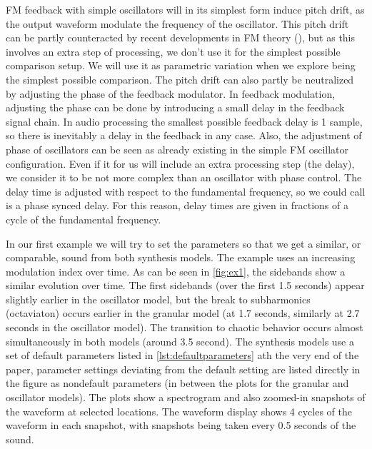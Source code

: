 \documentclass[runningheads,a4paper]{llncs}
\begin{document}
FM feedback with simple oscillators will in its simplest form induce pitch drift, as the output waveform modulate the frequency of the oscillator. This pitch drift can be partly counteracted by recent developments in FM theory (\cite{Lazzarini-2024}), but as this involves an extra step of processing, we don't use it for the simplest possible comparison setup. We will use it as parametric variation when we explore being the simplest possible comparison. The pitch drift can also partly be neutralized by adjusting the phase of the feedback modulator. In feedback modulation, adjusting the phase can be done by introducing a small delay in the feedback signal chain. In audio processing the smallest possible feedback delay is 1 sample, so there is inevitably a delay in the feedback in any case. Also, the adjustment of phase of oscillators can be seen as already existing in the simple FM oscillator configuration. Even if it for us will include an extra processing step (the delay), we consider it to be not more complex than an oscillator with phase control. The delay time is adjusted with respect to the fundamental frequency, so we could call is a phase synced delay. For this reason, delay times are given in fractions of a cycle of the fundamental frequency. 

In our first example we will try to set the parameters so that we get a similar, or comparable, sound from both synthesis models. The example uses an increasing modulation index over time. As can be seen in \ref{fig:ex1}, the sidebands show a similar evolution over time. The first sidebands (over the first 1.5 seconds) appear slightly earlier in the oscillator model, but the break to subharmonics (octaviaton) occurs earlier in the granular model (at 1.7 seconds, similarly at 2.7 seconds in the oscillator model). The transition to chaotic behavior occurs almost simultaneously in both models (around 3.5 second). The synthesis models use a set of default parameters listed in \ref{lst:defaultparameters} ath the very end of the paper, parameter settings deviating from the default setting are listed directly in the figure as nondefault parameters (in between the plots for the granular and oscillator models). The plots show a spectrogram and also zoomed-in snapshots of the waveform at selected locations. The waveform display shows 4 cycles of the waveform in each snapshot, with snapshots being taken every 0.5 seconds of the sound.
\end{document}
